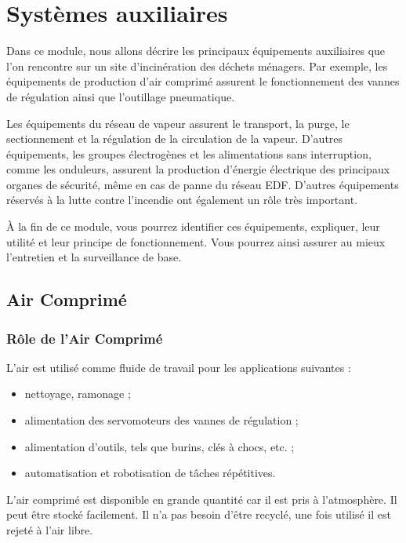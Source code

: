 \chapter{Systèmes auxiliaires}


Dans ce module, nous allons décrire les principaux équipements auxiliaires que l’on rencontre sur un site d’incinération des déchets ménagers. Par exemple, les équipements de production d’air comprimé assurent le fonctionnement des vannes de régulation ainsi que l’outillage pneumatique. 
\vspace{0.3cm}


Les équipements du réseau de vapeur assurent le transport, la purge, le sectionnement et la régulation de la circulation de la vapeur. D’autres équipements, les groupes électrogènes et les alimentations sans interruption, comme les onduleurs, assurent la production d’énergie électrique des principaux organes de sécurité, même en cas de panne du réseau EDF. D’autres équipements réservés à la lutte contre l’incendie ont également un rôle très important.

\vspace{0.3cm}

À la fin de ce module, vous pourrez identifier ces équipements, expliquer, leur utilité et leur principe de fonctionnement. Vous pourrez ainsi assurer au mieux l’entretien et la surveillance de base.


\section{Air Comprimé}


\subsection{Rôle de l'Air Comprimé}

L'air est utilisé comme fluide de travail pour les applications suivantes :
\begin{itemize}
\item  nettoyage, ramonage ;
\item  alimentation des servomoteurs des vannes de régulation ;
\item  alimentation d’outils, tels que burins, clés à chocs, etc. ;
\item  automatisation et robotisation de tâches répétitives.

\end{itemize}


L’air comprimé est disponible en grande quantité car il est pris à l’atmosphère. Il peut être stocké facilement. Il n’a pas besoin d’être recyclé, une fois utilisé il est rejeté à l’air libre.
\vspace{0.3cm}



